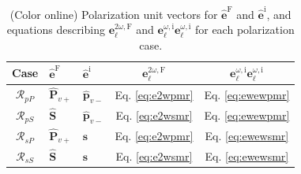 \documentclass[aps,prb,10pt,showpacs,letterpaper,twocolumn]{revtex4-1}
\begin{document}
\begin{table}[t]
\caption{(Color online) Polarization unit vectors for
$\hat{\mathbf{e}}^{\mathrm{F}}$ and $\hat{\mathbf{e}}^{\mathrm{i}}$, and
equations describing $\mathbf{e}^{2\omega,\mathrm{F}}_{\ell}$ and
$\mathbf{e}^{\omega,\mathrm{i}}_{\ell}\mathbf{e}^{\omega,\mathrm{i}}_{\ell}$ for
each polarization case.}
\label{tab:summary}
\centering
\begin{tabular}{| c | l | l | c | c |}
\hline
Case               & $\hat{\mathbf{e}}^{\mathrm{F}}$
                   & $\hat{\mathbf{e}}^{\mathrm{i}}$
                   & $\mathbf{e}^{2\omega,\mathrm{F}}_{\ell}$
                   & $\mathbf{e}^{\omega,\mathrm{i}}_{\ell}
                      \mathbf{e}^{\omega,\mathrm{i}}_{\ell}$ \\
\hline
$\mathcal{R}_{pP}$ & $\hat{\mathbf{P}}_{v+}$
                   & $\hat{\mathbf{p}}_{v-}$
                   &  Eq. \eqref{eq:e2wpmr} & Eq. \eqref{eq:ewewpmr} \\
$\mathcal{R}_{pS}$ & $\hat{\mathbf{S}}$
                   & $\hat{\mathbf{p}}_{v-}$
                   &  Eq. \eqref{eq:e2wsmr} & Eq. \eqref{eq:ewewpmr} \\
$\mathcal{R}_{sP}$ & $\hat{\mathbf{P}}_{v+}$
                   & $\hat{\mathbf{s}}$
                   &  Eq. \eqref{eq:e2wpmr} & Eq. \eqref{eq:ewewsmr} \\
$\mathcal{R}_{sS}$ & $\hat{\mathbf{S}}$
                   & $\hat{\mathbf{s}}$
                   &  Eq. \eqref{eq:e2wsmr} & Eq. \eqref{eq:ewewsmr} \\
\hline
\end{tabular}
\end{table}
\end{document}
